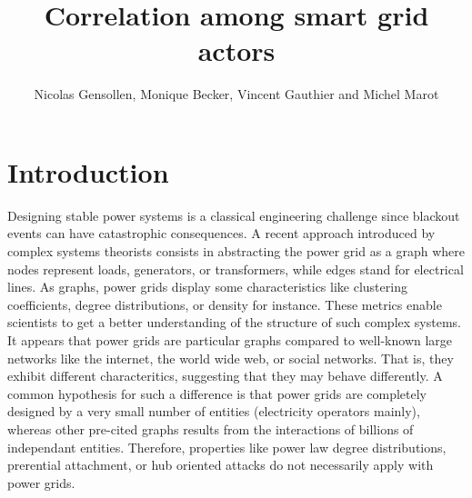 \documentclass[conference]{IEEEtran}
\begin{document}
%
%
\title{Correlation among smart grid actors}

%
%
\author{Nicolas Gensollen, Monique Becker, Vincent Gauthier and Michel Marot  \\
}

\maketitle

%
%
\begin{abstract}

\end{abstract}

\IEEEpeerreviewmaketitle


%
%
\section{Introduction}
\label{sec:introduction}

Designing stable power systems is a classical engineering challenge since blackout events can have catastrophic consequences. A recent approach introduced by complex systems theorists consists in abstracting the power grid as a graph where nodes represent loads, generators, or transformers, while edges stand for electrical lines. As graphs, power grids display some characteristics like clustering coefficients, degree distributions, or density for instance. These metrics enable scientists to get a better understanding of the structure of such complex systems. It appears that power grids are particular graphs compared to well-known large networks like the internet, the world wide web, or social networks. That is, they exhibit different characteritics, suggesting that they may behave differently. A common hypothesis for such a difference is that power grids are completely designed by a very small number of entities (electricity operators mainly), whereas other pre-cited graphs results from the interactions of billions of independant entities. Therefore, properties like power law degree distributions, prerential attachment, or hub oriented attacks do not necessarily apply with power grids.
\end{document}
